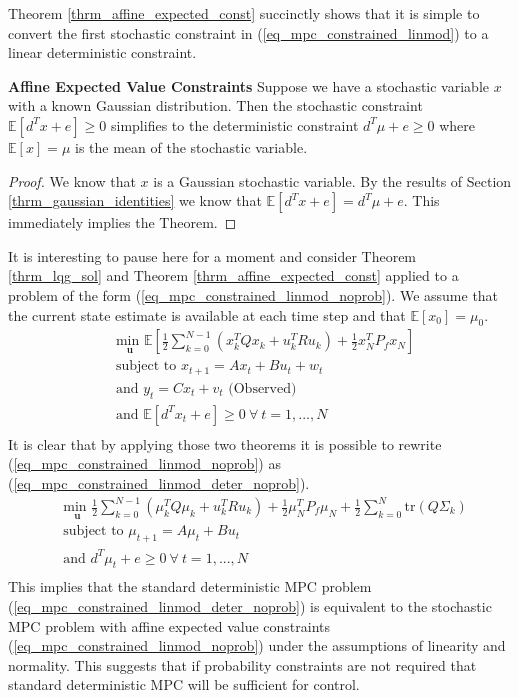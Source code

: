 Theorem \ref{thrm_affine_expected_const} succinctly shows that it is simple to convert the first stochastic constraint in (\ref{eq_mpc_constrained_linmod}) to a linear deterministic constraint.
\begin{thrm}
\textbf{Affine Expected Value Constraints} Suppose we have a stochastic variable $x$ with a known Gaussian distribution. Then the stochastic constraint $\mathbb{E}[d^Tx + e] \geq 0$ simplifies to the deterministic constraint $d^T\mu + e \geq 0$ where $\mathbb{E}[x]= \mu$ is the mean of the stochastic variable.
\label{thrm_affine_expected_const}
\end{thrm}
\begin{proof}
We know that $x$ is a Gaussian stochastic variable. By the results of Section \ref{thrm_gaussian_identities} we know that $\mathbb{E}[d^Tx + e] =d^T\mu + e$. This immediately implies the Theorem.
\end{proof}
It is interesting to pause here for a moment and consider Theorem \ref{thrm_lqg_sol} and Theorem \ref{thrm_affine_expected_const} applied to a problem of the form (\ref{eq_mpc_constrained_linmod_noprob}). We assume that the current state estimate is available at each time step and that $\mathbb{E}[x_0]=\mu_0$.
\begin{equation}
\begin{aligned}
&\underset{\mathbf{u}}{\text{min }} \mathbb{E}\left[ \frac{1}{2}\sum_{k=0}^{N-1} \left( x_k^TQx_k + u_k^TRu_k \right) + \frac{1}{2}x_N^TP_fx_N \right] \\
& \text{subject to } x_{t+1}=Ax_t+Bu_t + w_t \\
& \text{and } y_{t}= Cx_t + v_t \text{ (Observed)}\\
& \text{and } \mathbb{E}[d^Tx_t + e] \geq 0 ~\forall ~t=1,...,N \\
\end{aligned}
\label{eq_mpc_constrained_linmod_noprob}
\end{equation}
It is clear that by applying those two theorems it is possible to rewrite (\ref{eq_mpc_constrained_linmod_noprob}) as (\ref{eq_mpc_constrained_linmod_deter_noprob}).
\begin{equation}
\begin{aligned}
&\underset{\mathbf{u}}{\text{min }} \frac{1}{2}\sum_{k=0}^{N-1} \left( \mu_k^TQ\mu_k + u_k^TRu_k \right) + \frac{1}{2}\mu_N^TP_f\mu_N + \frac{1}{2}\sum_{k=0}^N \text{tr}(Q\Sigma_k) \\
& \text{subject to } \mu_{t+1}=A\mu_t + Bu_t \\
& \text{and } d^T\mu_t + e \geq 0 ~\forall ~t=1,...,N\\
\end{aligned}
\label{eq_mpc_constrained_linmod_deter_noprob}
\end{equation}
This implies that the standard deterministic MPC problem (\ref{eq_mpc_constrained_linmod_deter_noprob}) is equivalent to the stochastic MPC problem with affine expected value constraints (\ref{eq_mpc_constrained_linmod_noprob}) under the assumptions of linearity and normality. This suggests that if probability constraints are not required that standard deterministic MPC will be sufficient for control.

